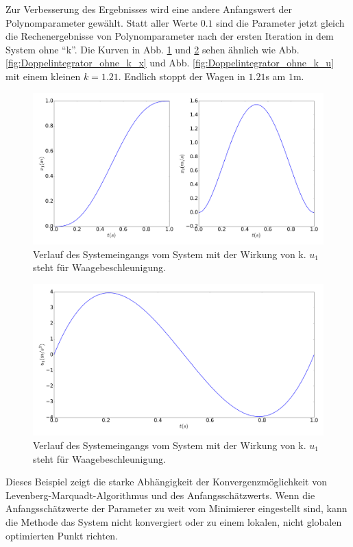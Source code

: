 \begin{beispiel}[Doppelintegrator]
	Zur Verbesserung des Ergebnisses wird eine andere Anfangswert der Polynomparameter gewählt. Statt aller Werte $0.1$ sind die Parameter jetzt gleich die Rechenergebnisse von Polynomparameter nach der ersten Iteration in dem System ohne ``k''. Die Kurven in Abb. \ref{fig:Doppelintegrator_mit_k_x_aus} und \ref{fig:Doppelintegrator_mit_k_u_aus} sehen ähnlich wie Abb. \ref{fig:Doppelintegrator_ohne_k_x} und Abb.  \ref{fig:Doppelintegrator_ohne_k_u} mit einem kleinen $k=1.21$. Endlich stoppt der Wagen in $1.21$s am $1$m. 
	\begin{figure}
		\centering
		\includegraphics[width=15.5cm]{bild/30_32/test0_mit_k_Ite1_x.pdf}
		\caption{Verlauf des Systemeingangs vom System mit der Wirkung von k. $u_{1}$ steht für Waagebeschleunigung.}
		\label{fig:Doppelintegrator_mit_k_x_aus}
	\end{figure}

	\begin{figure}
		\centering
		\includegraphics[width=12cm]{bild/30_32/test0_mit_k_Ite1_u.pdf}
		\caption{Verlauf des Systemeingangs vom System mit der Wirkung von k. $u_{1}$ steht für Waagebeschleunigung.}
		\label{fig:Doppelintegrator_mit_k_u_aus}
	\end{figure}
	
\end{beispiel}
\newpage
Dieses Beispiel zeigt die starke Abhängigkeit der Konvergenzmöglichkeit von Levenberg-Marquadt-Algorithmus und des Anfangsschätzwerts. Wenn die Anfangsschätzwerte der Parameter zu weit vom Minimierer eingestellt sind, kann die Methode das System nicht konvergiert oder zu einem lokalen, nicht globalen optimierten Punkt richten.


